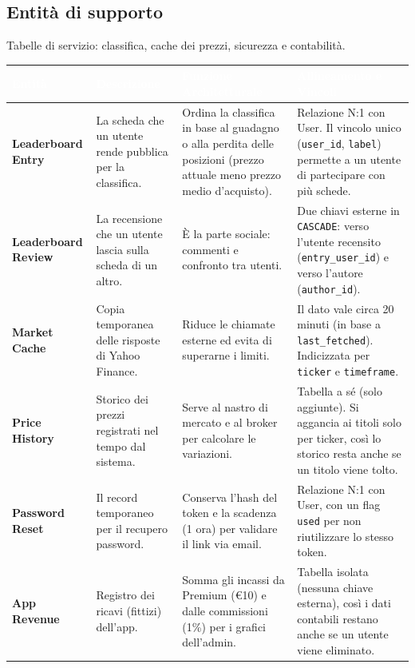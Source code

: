 \subsection{Entità di supporto}
Tabelle di servizio: classifica, cache dei prezzi, sicurezza e contabilità.

\begin{table}[H]
\centering
{}
\renewcommand{\arraystretch}{1.3}
\begin{tabularx}{\textwidth}{|l|X|X|X|}
\hline
\rowcolor[HTML]{3B3766}
\textcolor{white}{\textbf{Entità}} & \textcolor{white}{\textbf{Descrizione}} & \textcolor{white}{\textbf{Funzione Architetturale}} & \textcolor{white}{\textbf{Allineamento e Vincoli}} \\ \hline
\textbf{Leaderboard Entry} & La scheda che un utente rende pubblica per la classifica. & Ordina la classifica in base al guadagno o alla perdita delle posizioni (prezzo attuale meno prezzo medio d'acquisto). & Relazione N:1 con User. Il vincolo unico (\texttt{user\_\allowbreak{}id}, \texttt{label}) permette a un utente di partecipare con più schede. \\ \hline
\textbf{Leaderboard Review} & La recensione che un utente lascia sulla scheda di un altro. & È la parte sociale: commenti e confronto tra utenti. & Due chiavi esterne in \texttt{CASCADE}: verso l'utente recensito (\texttt{entry\_\allowbreak{}user\_\allowbreak{}id}) e verso l'autore (\texttt{author\_\allowbreak{}id}). \\ \hline
\textbf{Market Cache} & Copia temporanea delle risposte di Yahoo Finance. & Riduce le chiamate esterne ed evita di superarne i limiti. & Il dato vale circa 20 minuti (in base a \texttt{last\_\allowbreak{}fetched}). Indicizzata per \texttt{ticker} e \texttt{timeframe}. \\ \hline
\textbf{Price History} & Storico dei prezzi registrati nel tempo dal sistema. & Serve al nastro di mercato e al broker per calcolare le variazioni. & Tabella a sé (solo aggiunte). Si aggancia ai titoli solo per ticker, così lo storico resta anche se un titolo viene tolto. \\ \hline
\textbf{Password Reset} & Il record temporaneo per il recupero password. & Conserva l'hash del token e la scadenza (1 ora) per validare il link via email. & Relazione N:1 con User, con un flag \texttt{used} per non riutilizzare lo stesso token. \\ \hline
\textbf{App Revenue} & Registro dei ricavi (fittizi) dell'app. & Somma gli incassi da Premium (€10) e dalle commissioni (1\%) per i grafici dell'admin. & Tabella isolata (nessuna chiave esterna), così i dati contabili restano anche se un utente viene eliminato. \\ \hline
\end{tabularx}
\end{table}

